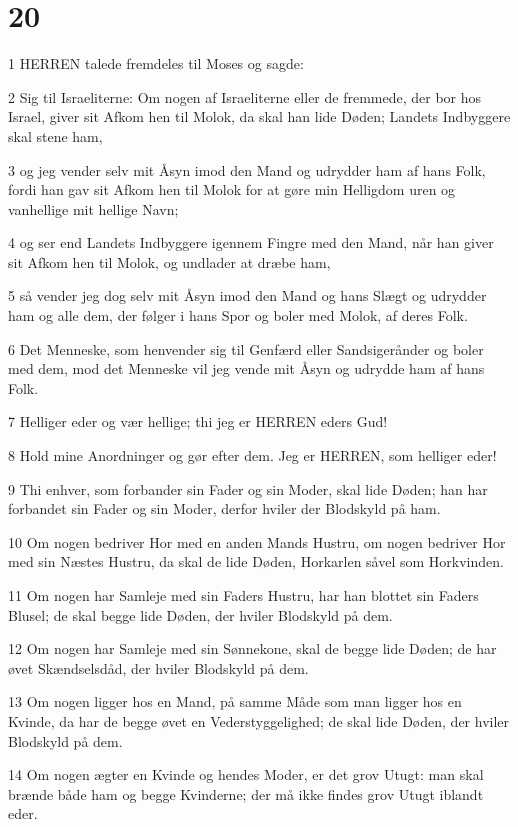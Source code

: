 \chapter{20}

\par 1 HERREN talede fremdeles til Moses og sagde:
\par 2 Sig til Israeliterne: Om nogen af Israeliterne eller de fremmede, der bor hos Israel, giver sit Afkom hen til Molok, da skal han lide Døden; Landets Indbyggere skal stene ham,
\par 3 og jeg vender selv mit Åsyn imod den Mand og udrydder ham af hans Folk, fordi han gav sit Afkom hen til Molok for at gøre min Helligdom uren og vanhellige mit hellige Navn;
\par 4 og ser end Landets Indbyggere igennem Fingre med den Mand, når han giver sit Afkom hen til Molok, og undlader at dræbe ham,
\par 5 så vender jeg dog selv mit Åsyn imod den Mand og hans Slægt og udrydder ham og alle dem, der følger i hans Spor og boler med Molok, af deres Folk.
\par 6 Det Menneske, som henvender sig til Genfærd eller Sandsigerånder og boler med dem, mod det Menneske vil jeg vende mit Åsyn og udrydde ham af hans Folk.
\par 7 Helliger eder og vær hellige; thi jeg er HERREN eders Gud!
\par 8 Hold mine Anordninger og gør efter dem. Jeg er HERREN, som helliger eder!
\par 9 Thi enhver, som forbander sin Fader og sin Moder, skal lide Døden; han har forbandet sin Fader og sin Moder, derfor hviler der Blodskyld på ham.
\par 10 Om nogen bedriver Hor med en anden Mands Hustru, om nogen bedriver Hor med sin Næstes Hustru, da skal de lide Døden, Horkarlen såvel som Horkvinden.
\par 11 Om nogen har Samleje med sin Faders Hustru, har han blottet sin Faders Blusel; de skal begge lide Døden, der hviler Blodskyld på dem.
\par 12 Om nogen har Samleje med sin Sønnekone, skal de begge lide Døden; de har øvet Skændselsdåd, der hviler Blodskyld på dem.
\par 13 Om nogen ligger hos en Mand, på samme Måde som man ligger hos en Kvinde, da har de begge øvet en Vederstyggelighed; de skal lide Døden, der hviler Blodskyld på dem.
\par 14 Om nogen ægter en Kvinde og hendes Moder, er det grov Utugt: man skal brænde både ham og begge Kvinderne; der må ikke findes grov Utugt iblandt eder.
